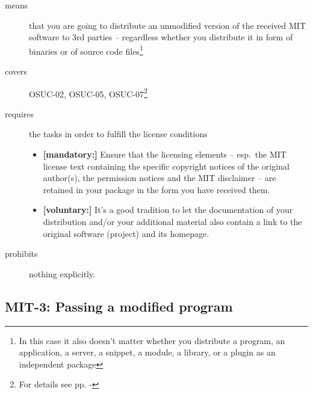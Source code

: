 \begin{description}
\item[means] that you are going to distribute an unmodified version of the
received MIT software to 3rd parties -- regardless whether you distribute it in
form of binaries or of source code files\footnote{In this case it also doesn't
matter whether you distribute a program, an application, a server, a snippet, a
module, a library, or a plugin as an independent package}

\item[covers] OSUC-02, OSUC-05, OSUC-07\footnote{For details see pp.
\pageref{OSUC-02-DEF} - \pageref{OSUC-07-DEF}}

\item[requires] the tasks in order to fulfill the license conditions
\begin{itemize}
  \item \textbf{[mandatory:]} Ensure that the licensing elements -- esp.\
  the MIT license text containing the specific copyright notices of the original
  author(s), the permission notices and the MIT disclaimer -- are retained in
  your package in the form you have received them.
  \item \textbf{[voluntary:]} It's a good tradition to let the documentation of
  your distribution and/or your additional material also contain a link to the
  original software (project) and its homepage.
\end{itemize}
\item[prohibits] nothing explicitly.
\end{description}

\subsection{MIT-3: Passing a modified program}
\label{OSUC-04-MIT}

